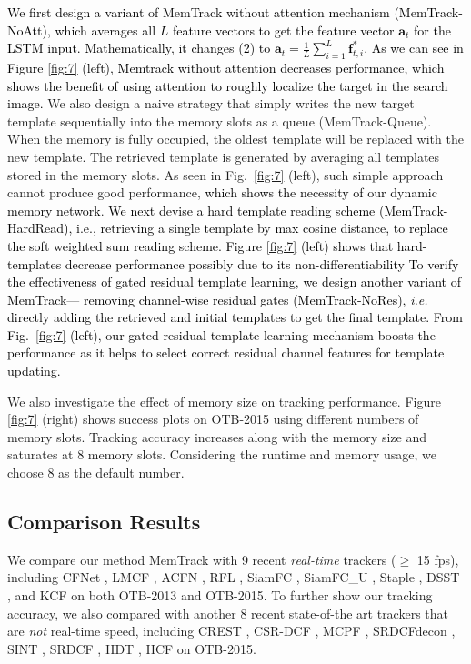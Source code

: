 \documentclass[runningheads]{llncs}
\newcommand{\yty}[1]{\textcolor{black}{#1}}
\newcommand{\abc}[1]{\textcolor{black}{#1}}
\newcommand{\abcn}[1]{\textcolor{black}{#1}}
\newcommand{\ty}[1]{\textcolor{black}{#1}}
\begin{document}
\yty{ We first design a variant of MemTrack without attention mechanism (MemTrack-NoAtt), which averages all $L$ feature vectors to get the %
	feature vector $\mathbf{a}_t$ \abcn{for the LSTM input.} 
	Mathematically, it changes %
	(2) to $\mathbf{a}_t = \frac{1}{L}\sum_{i=1}^{L}\mathbf{f}^*_{t,i} $. As we can see in Figure \ref{fig:7} (left), Memtrack without attention decreases performance, \abc{which shows the benefit of using attention to roughly localize the target in the search image.}} 
We also design a naive strategy that simply writes the new target template sequentially into the memory slots as a queue (MemTrack-Queue). When the memory is fully occupied, the oldest template will be replaced with the new  template. The retrieved template is generated by averaging all templates stored in the memory slots. As seen in Fig.~\ref{fig:7} (left), such simple approach cannot produce good performance, \abc{which shows the necessity of our dynamic memory network}. \ty{We next devise a hard template reading scheme (MemTrack-HardRead), i.e., retrieving a single template by max cosine distance, to replace the soft weighted sum reading scheme. Figure \ref{fig:7} (left) shows that hard-templates decrease performance possibly due to its non-differentiability }
\yty{To verify the effectiveness of \abc{gated} residual template learning, we design another variant of MemTrack--- removing channel-wise residual gates (MemTrack-NoRes), \emph{i.e.} directly adding the retrieved and initial templates to get the final template. From Fig.~\ref{fig:7} (left), our \abc{gated} residual template learning mechanism boosts the performance as it helps to select correct residual channel features for template updating.}

We also investigate the effect of memory size  on tracking performance. Figure \ref{fig:7} (right) shows success plots on OTB-2015 using different numbers of memory slots. Tracking accuracy increases along with the memory size and saturates at 8 memory slots. Considering the runtime and memory usage, we choose 8 as the default number. %

\subsection{Comparison Results}

We compare our method MemTrack with 9 recent {\em real-time} trackers ($\geq$ 15 fps), including CFNet \cite{Valmadre2017}, LMCF \cite{Wang2017}, ACFN \cite{Choi2017}, RFL \cite{Yang2017}, SiamFC \cite{Bertinetto2016}, SiamFC\_U \cite{Valmadre2017}, Staple \cite{Bertinetto2016-1}, DSST \cite{Danelljan2014}, and KCF \cite{Henriques2015} on both OTB-2013 and OTB-2015. 
To further show our tracking accuracy, we also compared with another 8 recent state-of-the art trackers that are {\em not} real-time speed, including CREST \cite{Song2017},  CSR-DCF \cite{Lukezic2017}, MCPF \cite{Zhang2017}, SRDCFdecon \cite{Danelljan2016}, SINT \cite{Tao2016}, SRDCF \cite{Danelljan2015}, HDT \cite{Qi2016}, HCF \cite{Ma2015} on OTB-2015.
\end{document}
